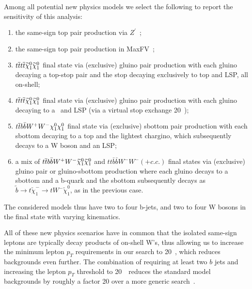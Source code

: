 Among all potential new physics models we select the following to report the sensitivity of this analysis:
\begin{enumerate}
\item the same-sign top pair production via $Z^\prime$~\cite{fcnczprime,sstop};
\item the same-sign top pair production in MaxFV~\cite{mxflv3};
\item $t\overline{t} t\overline{t} \widetilde\chi_1^0\widetilde\chi_1^0$ final state via (exclusive) gluino pair production with 
each gluino decaying a top-stop pair and the stop decaying
exclusively to top and LSP, all on-shell;
\item $t\overline{t} t\overline{t} \widetilde\chi_1^0\widetilde\chi_1^0$ final state via (exclusive) gluino pair production with 
each gluino decaying to a \ttbar\ and LSP (via a virtual stop exchange 20~\TeV);
\item $t\overline{t} b\bar{b} W^+W^- \chi_1^0\chi_1^0 $ final state via (exclusive) sbottom pair production with each 
sbottom decaying to a top and the lightest chargino, which subsequently decays to a W boson and an LSP;
\item a mix of $t\overline{t} b\bar{b} W^+W^- \widetilde\chi_1^0\widetilde\chi_1^0 $ and 
  $tt \bar{b}\bar{b} W^- W^-  (+c.c.)$ final states via (exclusive) gluino pair or gluino-sbottom
  production where each gluino decays to a sbottom and a b-quark and the sbottom subsequently decays as
  $\widetilde{b} \to t \widetilde{\chi}^-_1 \to t W^- \widetilde{\chi}^0_1  $, as in the previous case.
\end{enumerate}
The considered models thus have two to four b-jets, and two to four W bosons in the final state with varying kinematics.

All of these new physics scenarios have in common that the isolated same-sign leptons are typically decay products of on-shell W's,
thus allowing us to increase the minimum lepton $p_T$ requirements in our search to 20~\GeV, which reduces backgrounds even further.
The combination of requiring at least two $b$ jets and increasing the lepton $p_T$ threshold to 20~\GeV\ reduces the standard model backgrounds
by roughly a factor 20 over a more generic search~\cite{sspaper2010,sspaper2011}.


 
